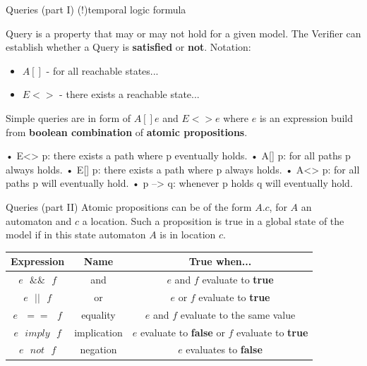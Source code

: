 \documentclass{beamer}
\begin{document}
\begin{frame}{Queries (part I)}
	(!)temporal logic formula
	
	Query is a property that may or may not hold for a given model. The Verifier can establish whether a Query is \textbf{satisfied} or \textbf{not}.\newline
	Notation:
	\begin{itemize}
		\item $A[]$ - for all reachable states...
		\item $E<>$ - there exists a reachable state...
	\end{itemize}
	Simple queries are in form of $A[] e$ and $E<> e$ where $e$ is an expression build from \textbf{boolean combination} of \textbf{atomic propositions}.
	
	
	• E<> p: there exists a path where p eventually holds.
	• A[] p: for all paths p always holds.
	• E[] p: there exists a path where p always holds.
	• A<> p: for all paths p will eventually hold.
	• p --> q: whenever p holds q will eventually hold.
\end{frame}

\begin{frame}{Queries (part II)}
	Atomic propositions can be of the form $A.c$, for $A$ an automaton and $c$ a location. Such a proposition is true in a global state of the model if in this state automaton $A$ is in location $c$.\newline
	
	\begin{tabular}{|c|c|c|}
		\hline \textbf{Expression} & \textbf{Name} & \textbf{True when...} \\ 
		\hline $e\text{ }\&\&\text{ }f$ & and & $e$ and $f$ evaluate to \textbf{true}	 \\ 
		\hline $e\text{ }||\text{ }f$ & or & $e$ or $f$ evaluate to \textbf{true} \\ 
		\hline $e\text{ }==\text{ }f$ & equality & $e$ and $f$ evaluate to the same value \\ 
		\hline $e\text{ }imply\text{ }f$ & implication & $e$ evaluate to \textbf{false} or $f$ evaluate to \textbf{true}\\ 
		\hline $e\text{ }not\text{ }f$ & negation & $e$ evaluates to \textbf{false} \\ 
		\hline 
	\end{tabular} 

\end{frame}
\end{document}
